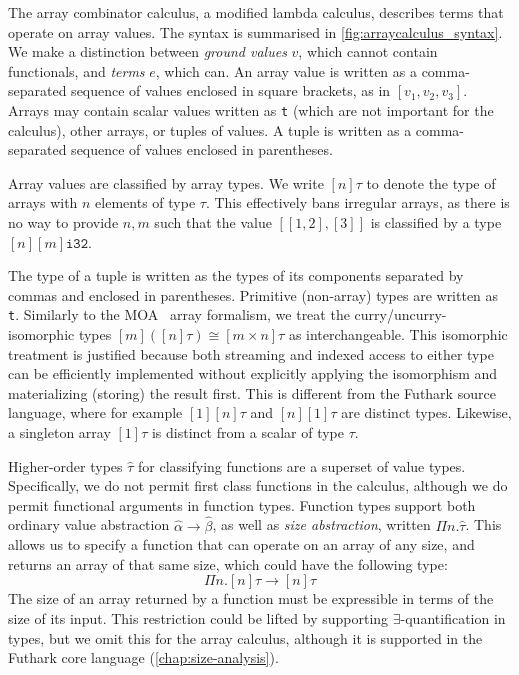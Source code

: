The array combinator calculus, a modified lambda calculus, describes
terms that operate on array values.  The syntax is summarised in
\cref{fig:arraycalculus_syntax}.  We make a distinction between
\textit{ground values}
$v$, which cannot contain functionals, and \textit{terms}
$e$, which can.  An array value is written as a comma-separated
sequence of values enclosed in square brackets, as in $[v_{1}, v_{2},
v_{3}]$.  Arrays may contain scalar values written as \texttt{t}
(which are not important for the calculus), other arrays, or tuples of
values.  A tuple is written as a comma-separated sequence of values
enclosed in parentheses.

Array values are classified by array types.  We write $[n]\tau$ to
denote the type of arrays with $n$ elements of type $\tau$.  This
effectively bans irregular arrays, as there is no way to provide $n,m$
such that the value $[[1,2],[3]]$ is classified by a type
$[n][m]\texttt{i32}$.

The type of a tuple is written as the types of its components
separated by commas and enclosed in parentheses.  Primitive
(non-array) types are written as \texttt{t}.  Similarly to the
MOA~\cite{moa} array formalism, we treat the curry/uncurry-isomorphic
types $[m]([n]\tau) \cong [m \times n]\tau$ as interchangeable.  This
isomorphic treatment is justified because both streaming and indexed
access to either type can be efficiently implemented without
explicitly applying the isomorphism and materializing (storing) the
result first.  This is different from the Futhark source language,
where for example $[1][n]\tau$ and $[n][1]\tau$ are distinct types.
Likewise, a singleton array $[1]\tau$ is distinct from a scalar of
type $\tau$.

Higher-order types $\hat{\tau}$ for classifying functions are a
superset of value types.  Specifically, we do not permit first class
functions in the calculus, although we do permit functional arguments
in function types.  Function types support both ordinary value
abstraction $\hat\alpha\rightarrow\hat\beta$, as well as \textit{size
  abstraction}, written $\Pi n.\hat\tau$.  This allows us to specify a
function that can operate on an array of any size, and returns an
array of that same size, which could have the following type:
\[
  \Pi n.[n]\tau\rightarrow[n]\tau
\]
The size of an array returned by a function must be expressible in
terms of the size of its input.  This restriction could be lifted by
supporting $\exists$-quantification in types, but we omit this for the
array calculus, although it is supported in the Futhark core language
(\cref{chap:size-analysis}).

